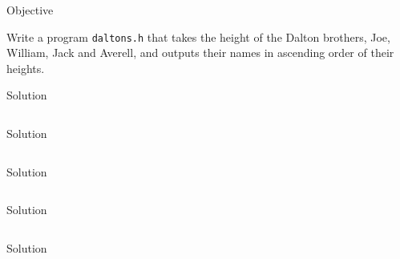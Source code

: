 \documentclass[compress]{beamer}
\begin{document}
\begin{slide}
	\begin{block}{Objective}

	Write a program \texttt{daltons.h} that takes the height of the Dalton brothers, Joe, William, Jack and Averell, and outputs their names in ascending order of their heights.

	\end{block}
\end{slide}

\begin{slide}
	\begin{block}{Solution}

	\inputminted[fontsize=\scriptsize, firstline=10, linenos]{c}{
		\resDirectory/daltons.h
	}

	\end{block}
\end{slide}

\begin{slide}
	\begin{block}{Solution}

	\inputminted[fontsize=\scriptsize, firstline=16, lastline=33, linenos]{c}{
		\resDirectory/daltons.c
	}

	\end{block}
\end{slide}

\begin{slide}
	\begin{block}{Solution}

	\inputminted[fontsize=\scriptsize, firstline=38, lastline=55, linenos]{c}{
		\resDirectory/daltons.c
	}

	\end{block}
\end{slide}

\begin{slide}
	\begin{block}{Solution}

	\inputminted[fontsize=\scriptsize, firstline=60, lastline=71, linenos]{c}{
		\resDirectory/daltons.c
	}

	\end{block}
\end{slide}

\begin{slide}
	\begin{block}{Solution}

	\inputminted[fontsize=\scriptsize, firstline=76, lastline=81, linenos]{c}{
		\resDirectory/daltons.c
	}

	\end{block}
\end{slide}
\end{document}
